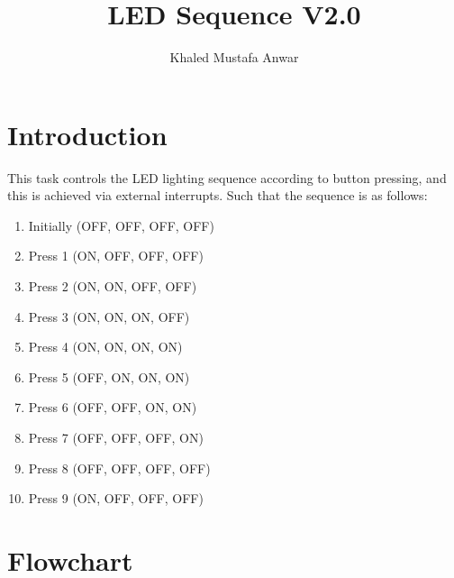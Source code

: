\documentclass[10pt]{article}
\title{LED Sequence V2.0}
\author{Khaled Mustafa Anwar}
\begin{document}
\maketitle

\section{Introduction}
This task controls the LED lighting sequence according to button pressing, and this is achieved via external interrupts.
Such that the sequence is as follows:
\begin{enumerate}
	\item Initially (OFF, OFF, OFF, OFF)
	\item Press 1 (ON, OFF, OFF, OFF)
	\item Press 2 (ON, ON, OFF, OFF)
	\item Press 3 (ON, ON, ON, OFF)
	\item Press 4 (ON, ON, ON, ON)
	\item Press 5 (OFF, ON, ON, ON)
	\item Press 6 (OFF, OFF, ON, ON)
	\item Press 7 (OFF, OFF, OFF, ON)
	\item Press 8 (OFF, OFF, OFF, OFF)
	\item Press 9 (ON, OFF, OFF, OFF)
\end{enumerate}

\section{Flowchart}
\end{document}

